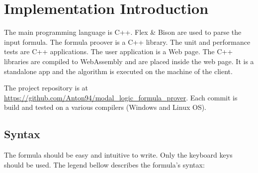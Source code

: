 \documentclass{article}
\begin{document}
	\newpage
	\section{Implementation Introduction}
	The main programming language is C++. Flex \& Bison \cite{flex-and-bison-overview} \cite{flex-and-bison-book} are used to parse the input formula. The formula proover is a C++ library. The unit and performance tests are C++ applications.
	The user application is a Web page. The C++ libraries are compiled to WebAssembly and are placed inside the web page. It is a standalone app and the algorithm is executed on the machine of the client.

	The project repository is at \url{https://github.com/Anton94/modal_logic_formula_prover}. Each commit is build and tested on a various compilers (Windows and Linux OS).
		
	\subsection{Syntax}
	The formula should be easy and intuitive to write. Only the keyboard keys should be used. The legend bellow describes the formula's syntax:
\end{document}
